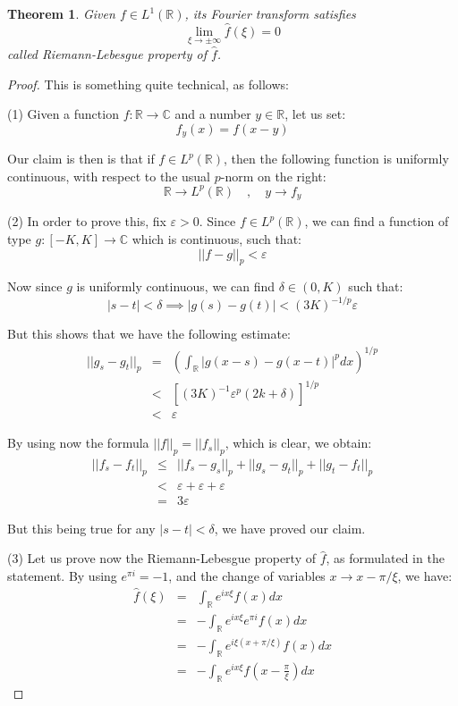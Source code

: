 \documentclass[12pt]{amsbook}
\newtheorem{theorem}{Theorem}[chapter]
\begin{document}

\begin{theorem}
Given $f\in L^1(\mathbb R)$, its Fourier transform satisfies
$$\lim_{\xi\to\pm\infty}\widehat{f}(\xi)=0$$
called Riemann-Lebesgue property of $\widehat{f}$.
\end{theorem}

\begin{proof}
This is something quite technical, as follows:

\medskip

(1) Given a function $f:\mathbb R\to\mathbb C$ and a number $y\in\mathbb R$, let us set:
$$f_y(x)=f(x-y)$$

Our claim is then is that if $f\in L^p(\mathbb R)$, then the following function is uniformly continuous, with respect to the usual $p$-norm on the right:
$$\mathbb R\to L^p(\mathbb R)\quad,\quad y\to f_y$$

(2) In order to prove this, fix $\varepsilon>0$. Since $f\in L^p(\mathbb R)$, we can find a function of type $g:[-K,K]\to\mathbb C$ which is continuous, such that:
$$||f-g||_p<\varepsilon$$

Now since $g$ is uniformly continuous, we can find $\delta\in(0,K)$ such that:
$$|s-t|<\delta\implies|g(s)-g(t)|<(3K)^{-1/p}\varepsilon$$

But this shows that we have the following estimate:
\begin{eqnarray*}
||g_s-g_t||_p
&=&\left(\int_\mathbb R\big|g(x-s)-g(x-t)\big|^pdx\right)^{1/p}\\
&<&\left[(3K)^{-1}\varepsilon^p(2k+\delta)\right]^{1/p}\\
&<&\varepsilon
\end{eqnarray*}

By using now the formula $||f||_p=||f_s||_p$, which is clear, we obtain:
\begin{eqnarray*}
||f_s-f_t||_p
&\leq&||f_s-g_s||_p+||g_s-g_t||_p+||g_t-f_t||_p\\
&<&\varepsilon+\varepsilon+\varepsilon\\
&=&3\varepsilon
\end{eqnarray*}

But this being true for any $|s-t|<\delta$, we have proved our claim.

\medskip

(3) Let us prove now the Riemann-Lebesgue property of $\widehat{f}$, as formulated in the statement. By using $e^{\pi i}=-1$, and the change of variables $x\to x-\pi/\xi$, we have:
\begin{eqnarray*}
\widehat{f}(\xi)
&=&\int_\mathbb Re^{ix\xi}f(x)dx\\
&=&-\int_\mathbb Re^{ix\xi}e^{\pi i}f(x)dx\\
&=&-\int_\mathbb Re^{i\xi(x+\pi/\xi)}f(x)dx\\
&=&-\int_\mathbb Re^{ix\xi}f\left(x-\frac{\pi}{\xi}\right)dx
\end{eqnarray*}


\end{proof}
\end{document}
